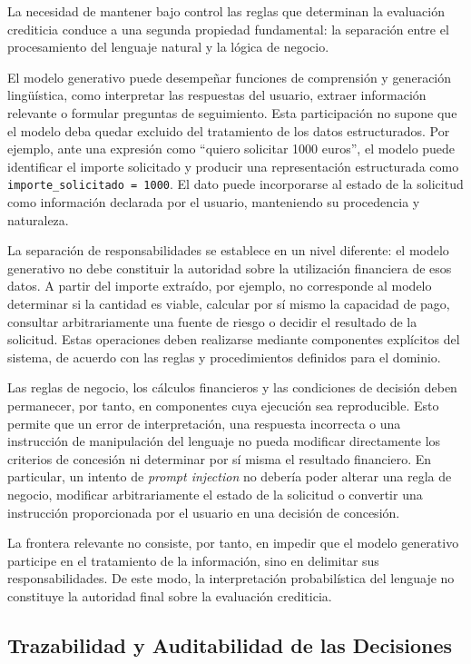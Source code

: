 \documentclass[12pt,a4paper]{report}
\begin{document}
La necesidad de mantener bajo control las reglas que determinan la evaluación crediticia conduce a una segunda propiedad fundamental: la separación entre el procesamiento del lenguaje natural y la lógica de negocio.

El modelo generativo puede desempeñar funciones de comprensión y generación lingüística, como interpretar las respuestas del usuario, extraer información relevante o formular preguntas de seguimiento. Esta participación no supone que el modelo deba quedar excluido del tratamiento de los datos estructurados. Por ejemplo, ante una expresión como ``quiero solicitar 1000 euros'', el modelo puede identificar el importe solicitado y producir una representación estructurada como \texttt{importe\_solicitado = 1000}. El dato puede incorporarse al estado de la solicitud como información declarada por el usuario, manteniendo su procedencia y naturaleza.

La separación de responsabilidades se establece en un nivel diferente: el modelo generativo no debe constituir la autoridad sobre la utilización financiera de esos datos. A partir del importe extraído, por ejemplo, no corresponde al modelo determinar si la cantidad es viable, calcular por sí mismo la capacidad de pago, consultar arbitrariamente una fuente de riesgo o decidir el resultado de la solicitud. Estas operaciones deben realizarse mediante componentes explícitos del sistema, de acuerdo con las reglas y procedimientos definidos para el dominio.

Las reglas de negocio, los cálculos financieros y las condiciones de decisión deben permanecer, por tanto, en componentes cuya ejecución sea reproducible. Esto permite que un error de interpretación, una respuesta incorrecta o una instrucción de manipulación del lenguaje no pueda modificar directamente los criterios de concesión ni determinar por sí misma el resultado financiero. En particular, un intento de \textit{prompt injection} no debería poder alterar una regla de negocio, modificar arbitrariamente el estado de la solicitud o convertir una instrucción proporcionada por el usuario en una decisión de concesión.

La frontera relevante no consiste, por tanto, en impedir que el modelo generativo participe en el tratamiento de la información, sino en delimitar sus responsabilidades. De este modo, la interpretación probabilística del lenguaje no constituye la autoridad final sobre la evaluación crediticia.

\subsection{Trazabilidad y Auditabilidad de las Decisiones}
\end{document}
